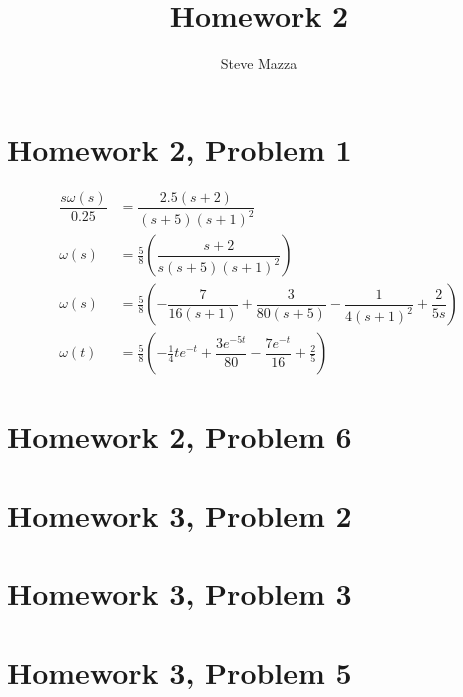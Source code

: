 \documentclass[letterpaper,10pt]{article}
\title{Homework 2}
\author{Steve Mazza}
\begin{document}
\maketitle

\section*{Homework 2, Problem 1}
\begin{align*}
	\dfrac{s\omega(s)}{0.25} &= \dfrac{2.5(s+2)}{(s+5)(s+1)^2} \\
	\omega(s) &= \frac{5}{8}\left(\dfrac{s+2}{s(s+5)(s+1)^2}\right) \\
	\omega(s) &= \frac{5}{8}\left(-\dfrac{7}{16(s+1)} + \dfrac{3}{80(s+5)} - \dfrac{1}{4(s+1)^2}+ \dfrac{2}{5s}\right) \\
	\omega(t) &= \frac{5}{8}\left(-\frac{1}{4}te^{-t} + \dfrac{3e^{-5t}}{80} - \dfrac{7e^{-t}}{16} + \frac{2}{5}\right)
\end{align*}

\section*{Homework 2, Problem 6}

\section*{Homework 3, Problem 2}

\section*{Homework 3, Problem 3}

\section*{Homework 3, Problem 5}
\end{document}
